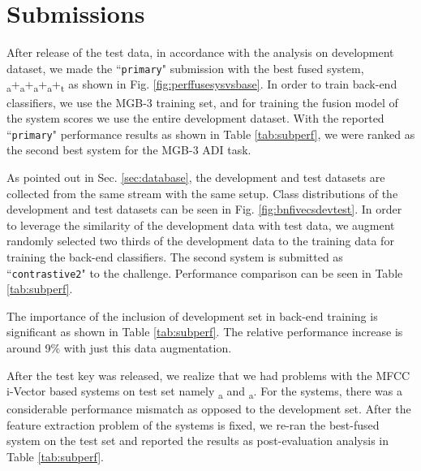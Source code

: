 \documentclass{article}
\begin{document}
\section{Submissions}
\label{sec:submissions}

After release of the test data, in accordance with the analysis on development dataset, we made the ``\texttt{primary}" submission with the best fused system, \textsubscript{a}+\textsubscript{a}+\textsubscript{a}+\textsubscript{a}+\textsubscript{t} as shown in Fig. \ref{fig:perffusesysvsbase}. In order to train back-end classifiers, we use the MGB-3 training set, and for training the fusion model of the system scores we use the entire development dataset. With the reported ``\texttt{primary}" performance results as shown in Table \ref{tab:subperf}, we were ranked as the second best system for the MGB-3 ADI task. 

As pointed out in Sec. \ref{sec:database}, the development and test datasets are collected from the same stream with the same setup. Class distributions of the development and test datasets can be seen in Fig. \ref{fig:bnfivecsdevtest}. In order to leverage the similarity of the development data with test data, we augment randomly selected two thirds of the development data to the training data for training the back-end classifiers. The second system is submitted as ``\texttt{contrastive2}" to the challenge. Performance comparison can be seen in Table \ref{tab:subperf}.

The importance of the inclusion of development set in back-end training is significant as shown in Table \ref{tab:subperf}. The relative performance increase is around 9\% with just this data augmentation.

After the test key was released, we realize that we had problems with the MFCC i-Vector based systems on test set namely \textsubscript{a} and \textsubscript{a}. For the systems, there was a considerable performance mismatch as opposed to the development set. After the feature extraction problem of the systems is fixed, we re-ran the best-fused system on the test set and reported the results as post-evaluation analysis in Table \ref{tab:subperf}.
\end{document}
